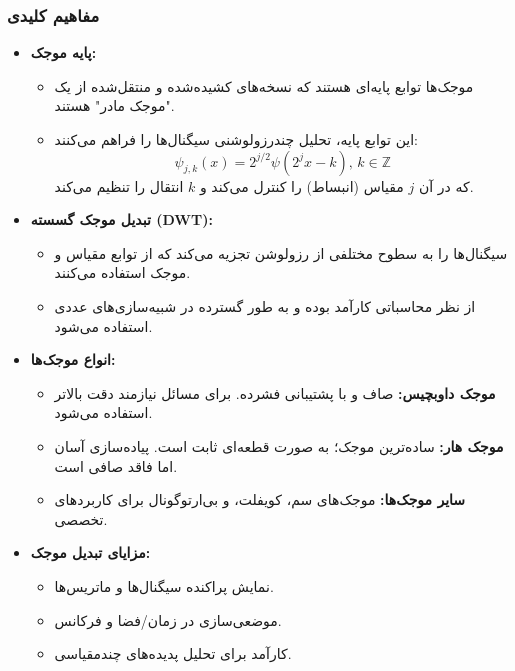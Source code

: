 \documentclass[12pt,a4paper]{article}
\begin{document}
\subsubsection{مفاهیم کلیدی}
\begin{itemize}
    \item \textbf{پایه موجک:}
          \begin{itemize}
              \item موجک‌ها توابع پایه‌ای هستند که نسخه‌های کشیده‌شده و منتقل‌شده از یک "موجک مادر" هستند.
              \item این توابع پایه، تحلیل چندرزولوشنی سیگنال‌ها را فراهم می‌کنند:
                    \[
                        \psi_{j,k}(x) = 2^{j/2} \psi(2^j x - k), \, k \in \mathbb{Z}
                    \]
                    که در آن \(j\) مقیاس (انبساط) را کنترل می‌کند و \(k\) انتقال را تنظیم می‌کند.
          \end{itemize}
    \item \textbf{تبدیل موجک گسسته (DWT):}
          \begin{itemize}
              \item سیگنال‌ها را به سطوح مختلفی از رزولوشن تجزیه می‌کند که از توابع مقیاس و موجک استفاده می‌کنند.
              \item از نظر محاسباتی کارآمد بوده و به طور گسترده در شبیه‌سازی‌های عددی استفاده می‌شود.
          \end{itemize}
    \item \textbf{انواع موجک‌ها:}
          \begin{itemize}
              \item \textbf{موجک داوبچیس:} صاف و با پشتیبانی فشرده. برای مسائل نیازمند دقت بالاتر استفاده می‌شود.
              \item \textbf{موجک هار:} ساده‌ترین موجک؛ به صورت قطعه‌ای ثابت است. پیاده‌سازی آسان اما فاقد صافی است.
              \item \textbf{سایر موجک‌ها:} موجک‌های سم، کویفلت، و بی‌ارتوگونال برای کاربردهای تخصصی.
          \end{itemize}
    \item \textbf{مزایای تبدیل موجک:}
          \begin{itemize}
              \item نمایش پراکنده سیگنال‌ها و ماتریس‌ها.
              \item موضعی‌سازی در زمان/فضا و فرکانس.
              \item کارآمد برای تحلیل پدیده‌های چندمقیاسی.
          \end{itemize}
\end{itemize}
\end{document}
